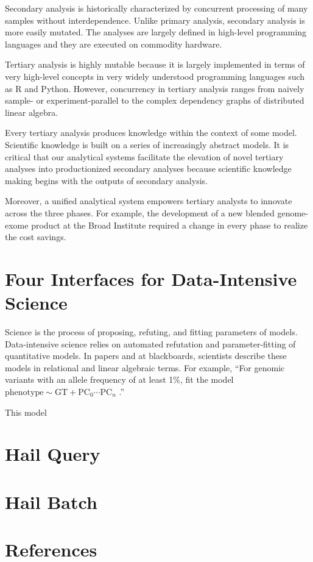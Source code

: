 \documentclass[10pt]{article}
\begin{document}
Secondary analysis is historically characterized by concurrent processing of many samples without interdependence. Unlike primary analysis, secondary analysis is more easily mutated. The analyses are largely defined in high-level programming languages and they are executed on commodity hardware. %
%

Tertiary analysis is highly mutable because it is largely implemented in terms of very high-level concepts in very widely understood programming languages such as R and Python. However, concurrency in tertiary analysis ranges from naively sample- or experiment-parallel to the complex dependency graphs of distributed linear algebra. %
%

Every tertiary analysis produces knowledge within the context of some model. Scientific knowledge is built on a series of increasingly abstract models. It is critical that our analytical systems facilitate the elevation of novel tertiary analyses into productionized secondary analyses because scientific knowledge making begins with the outputs of secondary analysis.

Moreover, a unified analytical system empowers tertiary analysts to innovate across the three phases. For example, the development of a new blended genome-exome product at the Broad Institute required a change in every phase to realize the cost savings.

\section{Four Interfaces for Data-Intensive Science}

Science is the process of proposing, refuting, and fitting parameters of models. Data-intensive science relies on automated refutation and parameter-fitting of quantitative models. In papers and at blackboards, scientists describe these models in relational and linear algebraic terms. For example, ``For genomic variants with an allele frequency of at least 1\%, fit the model %
%
$\mathrm{phenotype} \sim \mathrm{GT} + \mathrm{PC}_0 \cdots \mathrm{PC}_n$ %
%
.''

This model 

\section{Hail Query}

\section{Hail Batch}

\cite{dremel}
\cite{numpywren}
\cite{rdd}

\section{References}
\printbibliography
\end{document}
